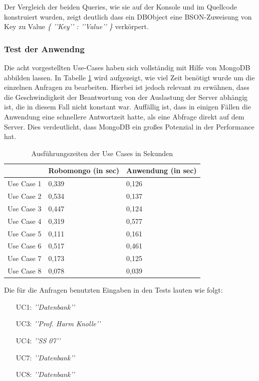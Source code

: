 Der Vergleich der beiden Queries, wie sie auf der Konsole und im Quellcode konstruiert wurden, zeigt deutlich dass ein DBObject eine BSON-Zuweisung von Key zu Value \textit{\{ ’’Key’’ : ’’Value’’ \}} verkörpert.

\subsubsection{Test der Anwendng}
Die acht vorgestellten Use-Cases haben sich vollständig mit Hilfe von MongoDB abbilden lassen. In Tabelle \ref{tab:ausfuehrungszeiten} wird aufgezeigt, wie viel Zeit benötigt wurde um die einzelnen Anfragen zu bearbeiten. Hierbei ist jedoch relevant zu erwähnen, dass die Geschwindigkeit der Beantwortung von der Auslastung der Server abhängig ist, die in diesem Fall nicht konstant war. Auffällig ist, dass in einigen Fällen die Anwendung eine schnellere Antwortzeit hatte, als eine Abfrage direkt auf dem Server. Dies verdeutlicht, dass MongoDB ein großes Potenzial in der Performance hat.

\begin{table}[h]
\caption{Ausführungszeiten der Use Cases in Sekunden}
\centering
\begin{tabular}{|p{3cm}|p{4cm}|p{4cm}|}
\hline
     & Robomongo (in sec) & Anwendung (in sec) \\
\hline
Use Case 1 & 0,339 & 0,126 \\
\hline
Use Case 2 & 0,534 & 0,137 \\
\hline
Use Case 3 & 0,447 & 0,124 \\
\hline
Use Case 4 & 0,319 & 0,577 \\
\hline
Use Case 5 & 0,111 & 0,161 \\
\hline
Use Case 6 & 0,517 & 0,461 \\
\hline
Use Case 7 & 0,173 & 0,125 \\
\hline
Use Case 8 & 0,078 & 0,039 \\
\hline
\end{tabular}
\label{tab:ausfuehrungszeiten}
\end{table}


Die für die Anfragen benutzten Eingaben in den Tests lauten wie folgt: 

\begin{itemize}
\item [UC1:] \textit{’’Datenbank’’}
\item [UC3:] \textit{’’Prof. Harm Knolle’’}
\item [UC4:] \textit{’’SS 07’’}
\item [UC7:] \textit{’’Datenbank’’}
\item [UC8:] \textit{’’Datenbank’’}
\end{itemize}

